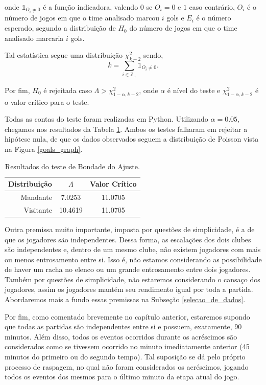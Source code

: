 \noindent onde $\mathbb{1}_{O_i \neq 0}$ é a função indicadora, valendo $0$ se $O_i = 0$ e $1$ caso contrário, $O_i$ é o número de jogos em que o time analisado marcou $i$ gols e $E_i$ é o número esperado, segundo a distribuição de $H_0$ do número de jogos em que o time analisado marcaria $i$ gols.

Tal estatística segue uma distribuição $\chi^2_{k - 2}$ sendo,
\[k = \sum_{i \in \mathbb{Z}_+} \mathbb{1}_{O_i \neq 0}.\]

Por fim, $H_0$ é rejeitada caso $\Lambda > \chi^2_{1 - \alpha, k - 2}$, onde $\alpha$ é nível do teste e $\chi^2_{1 - \alpha, k - 2}$ é o valor crítico para o teste.

Todas as contas do teste foram realizadas em Python. Utilizando $\alpha = 0.05$, chegamos nos resultados da Tabela \ref{hyp_test}. Ambos os testes falharam em rejeitar a hipótese nula, de que os dados observados seguem a distribuição de Poisson vista na Figura \ref{goals_graph}.
\begin{table}[h]
    \centering
    \begin{tabular}{|r|c|c|}
        \hline
        Distribuição & $\Lambda$  & Valor Crítico \\ \hline
        Mandante     & 7.0253     & 11.0705       \\
        Visitante    & 10.4619    & 11.0705       \\ \hline
    \end{tabular}
    \caption{Resultados do teste de Bondade do Ajuste.}
    \label{hyp_test}
\end{table}

Outra premissa muito importante, imposta por questões de simplicidade, é a de que os jogadores são independentes. Dessa forma, as escalações dos dois clubes são independentes e, dentro de um mesmo clube, não existem jogadores com mais ou menos entrosamento entre si. Isso é, não estamos considerando as possibilidade de haver um racha no elenco ou um grande entrosamento entre dois jogadores. Também por questões de simplicidade, não estaremos considerando o cansaço dos jogadores, assim os jogadores mantém seu rendimento igual por toda a partida. Abordaremos mais a fundo essas premissas na Subseção \ref{selecao_de_dados}.

Por fim, como comentado brevemente no capítulo anterior, estaremos supondo que todas as partidas são independentes entre si e possuem, exatamente, 90 minutos. Além disso, todos os eventos ocorridos durante os acréscimos são considerados como se tivessem ocorrido no minuto imediatamente anterior (45 minutos do primeiro ou do segundo tempo). Tal suposição se dá pelo próprio processo de raspagem, no qual não foram considerados os acréscimos, jogando todos os eventos dos mesmos para o último minuto da etapa atual do jogo.

